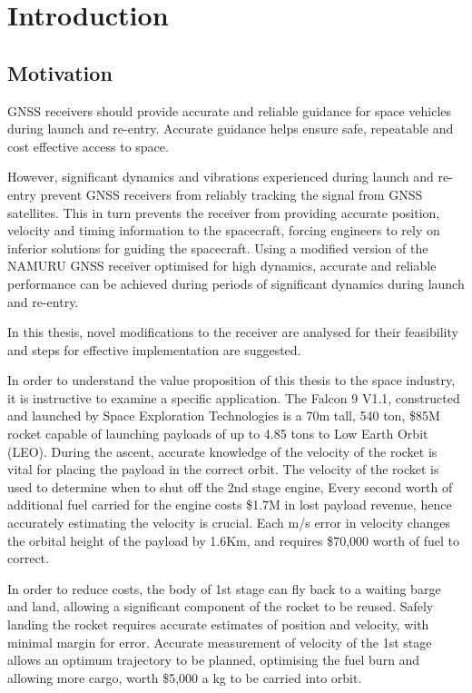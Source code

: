 \chapter{Introduction}\label{ch:intro}

\section{Motivation}
\ac{GNSS} receivers should provide accurate and reliable guidance for space vehicles during launch and re-entry. Accurate guidance helps ensure safe, repeatable and cost effective access to space.

However, significant dynamics and vibrations experienced during launch and re-entry prevent \ac{GNSS} receivers from reliably tracking the signal from \ac{GNSS} satellites. This in turn prevents the receiver from providing accurate position, velocity and timing information to the spacecraft, forcing engineers to rely on inferior solutions for guiding the spacecraft. Using a modified version of the \ac{NAMURU} \ac{GNSS} receiver optimised for high dynamics, accurate and reliable performance can be achieved during periods of significant dynamics during launch and re-entry. 

In this thesis, novel modifications to the receiver are analysed for their feasibility and steps for effective implementation are suggested.


In order to understand the value proposition of this thesis to the space industry, it is instructive to examine a specific application. The Falcon 9 V1.1, constructed and launched by
Space Exploration Technologies is a 70m tall, 540
ton, \$85M rocket capable of launching payloads of
up to 4.85 tons to Low Earth Orbit (LEO).
During the ascent, accurate knowledge of the
velocity of the rocket is vital for placing the payload
in the correct orbit. The velocity of the rocket is used
to determine when to shut off the 2nd stage engine,
Every second worth of additional fuel carried for the
engine costs \$1.7M in lost payload revenue, hence
accurately estimating the velocity is crucial. Each
m/s error in velocity changes the orbital height of the
payload by 1.6Km, and requires \$70,000 worth of
fuel to correct.

In order to reduce costs, the body of 1st stage can fly
back to a waiting barge and land, allowing a
significant component of the rocket to be reused.
Safely landing the rocket requires accurate
estimates of position and velocity, with minimal
margin for error. Accurate measurement of velocity
of the 1st stage allows an optimum trajectory to be
planned, optimising the fuel burn and allowing more
cargo, worth \$5,000 a kg to be carried into orbit.

